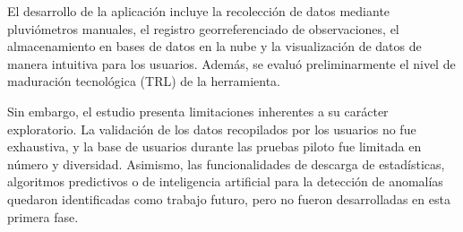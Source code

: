 El desarrollo de la aplicación incluye la recolección de datos mediante pluviómetros manuales, el registro georreferenciado de observaciones, el almacenamiento en bases de datos en la nube y la visualización de datos de manera intuitiva para los usuarios. Además, se evaluó preliminarmente el nivel de maduración tecnológica (TRL) de la herramienta.

Sin embargo, el estudio presenta limitaciones inherentes a su carácter exploratorio. La validación de los datos recopilados por los usuarios no fue exhaustiva, y la base de usuarios durante las pruebas piloto fue limitada en número y diversidad. Asimismo, las funcionalidades de descarga de estadísticas, algoritmos predictivos o de inteligencia artificial para la detección de anomalías quedaron identificadas como trabajo futuro, pero no fueron desarrolladas en esta primera fase.
